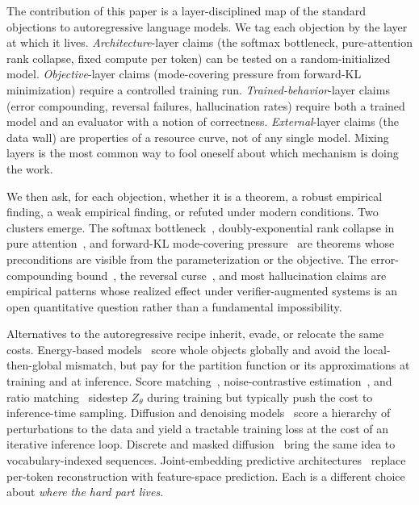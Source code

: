 The contribution of this paper is a layer-disciplined map of the standard objections to autoregressive language models.
We tag each objection by the layer at which it lives.
\emph{Architecture}-layer claims (\eg the softmax bottleneck, pure-attention rank collapse, fixed compute per token) can be tested on a random-initialized model.
\emph{Objective}-layer claims (\eg mode-covering pressure from forward-KL minimization) require a controlled training run.
\emph{Trained-behavior}-layer claims (\eg error compounding, reversal failures, hallucination rates) require both a trained model and an evaluator with a notion of correctness.
\emph{External}-layer claims (\eg the data wall) are properties of a resource curve, not of any single model.
Mixing layers is the most common way to fool oneself about which mechanism is doing the work.

We then ask, for each objection, whether it is a theorem, a robust empirical finding, a weak empirical finding, or refuted under modern conditions.
Two clusters emerge.
The softmax bottleneck~\citep{yang2018softmax}, doubly-exponential rank collapse in pure attention~\citep{dong2021attention}, and forward-KL mode-covering pressure~\citep{theis2016note,minka2005divergence} are theorems whose preconditions are visible from the parameterization or the objective.
The error-compounding bound~\citep{lecun2022autonomous,bachmann2024pitfalls}, the reversal curse~\citep{berglund2023reversal}, and most hallucination claims are empirical patterns whose realized effect under verifier-augmented systems is an open quantitative question rather than a fundamental impossibility.

Alternatives to the autoregressive recipe inherit, evade, or relocate the same costs.
Energy-based models~\citep{lecun2006tutorial,grathwohl2019your} score whole objects globally and avoid the local-then-global mismatch, but pay for the partition function or its approximations at training and at inference.
Score matching~\citep{hyvarinen2005score}, noise-contrastive estimation~\citep{gutmann2010noise}, and ratio matching~\citep{hyvarinen2007some} sidestep $Z_\theta$ during training but typically push the cost to inference-time sampling.
Diffusion and denoising models~\citep{sohldickstein2015deep,ho2020denoising,song2021scorebased,nichol2021improved} score a hierarchy of perturbations to the data and yield a tractable training loss at the cost of an iterative inference loop.
Discrete and masked diffusion~\citep{lou2023discrete,nie2024scaling} bring the same idea to vocabulary-indexed sequences.
Joint-embedding predictive architectures~\citep{lecun2022autonomous} replace per-token reconstruction with feature-space prediction.
Each is a different choice about \emph{where the hard part lives}.

